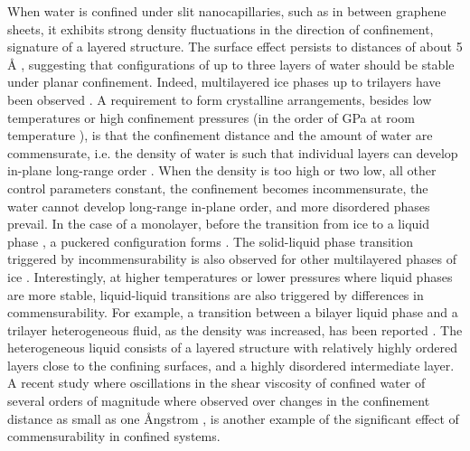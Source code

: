 \documentclass[12pt]{article}
\begin{document}
When water is confined under slit nanocapillaries, such as in between graphene sheets, it exhibits strong density fluctuations in the direction of confinement, signature of a layered structure. The surface effect persists to distances of about 5 \r A \cite{Cicero2008,Chialvo2016}, suggesting that configurations of up to three layers of water should be stable under planar confinement. Indeed, multilayered ice phases up to trilayers have been observed \cite{Algara-Siller2015,Satarifard2017}. A requirement to form crystalline arrangements, besides low temperatures or high confinement pressures (in the order of GPa at room temperature \cite{Algara-Siller2015,Satarifard2017}), is that the confinement distance and the amount of water are commensurate, i.e. the density of water is such that individual layers can develop in-plane long-range order \cite{Satarifard2017,Chen2017,Corsetti2016}. When the density is too high or two low, all other control parameters constant, the confinement becomes incommensurate, the water cannot develop long-range in-plane order, and more disordered phases prevail. In the case of a monolayer, before the transition from ice to a liquid phase \cite{Han2010}, a puckered configuration forms \cite{Kaneko2014,Zhu2016}. The solid-liquid phase transition triggered by incommensurability is also observed for other multilayered phases of ice \cite{Zhu2015}. Interestingly, at higher temperatures or lower pressures where liquid phases are more stable, liquid-liquid transitions are also triggered by differences in commensurability. For example, a transition between a bilayer liquid phase and a trilayer heterogeneous fluid, as the density was increased, has been reported \cite{Giovambattista2009}. The heterogeneous liquid consists of a layered structure with relatively highly ordered layers close to the confining surfaces, and a highly disordered intermediate layer. A recent study where oscillations in the shear viscosity of confined water of several orders of magnitude where observed over changes in the confinement distance as small as one \r Angstrom \cite{Neek-Amal2016}, is another example of the significant effect of commensurability in confined systems.
\end{document}
